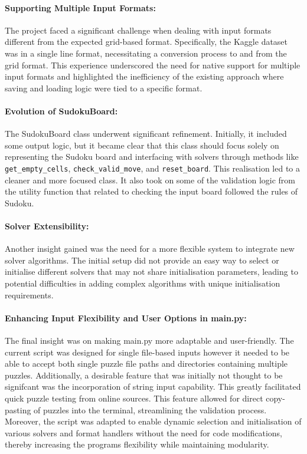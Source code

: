 \documentclass[11pt]{article}
\begin{document}
\paragraph{Supporting Multiple Input Formats:}
The project faced a significant challenge when dealing with input formats different from the expected grid-based format. Specifically, the Kaggle dataset was in a single line format, necessitating a conversion process to and from the grid format. This experience underscored the need for native support for multiple input formats and highlighted the inefficiency of the existing approach where saving and loading logic were tied to a specific format.

\paragraph{Evolution of SudokuBoard:}
The SudokuBoard class underwent significant refinement. Initially, it included some output logic, but it became clear that this class should focus solely on representing the Sudoku board and interfacing with solvers through methods like \texttt{get\_empty\_cells}, \texttt{check\_valid\_move}, and \texttt{reset\_board}. This realisation led to a cleaner and more focused class. It also took on some of the validation logic from the utility function that related to checking the input board followed the rules of Sudoku.

\paragraph{Solver Extensibility:}
Another insight gained was the need for a more flexible system to integrate new solver algorithms. The initial setup did not provide an easy way to select or initialise different solvers that may not share initialisation parameters, leading to potential difficulties in adding complex algorithms with unique initialisation requirements.

\paragraph{Enhancing Input Flexibility and User Options in main.py:}
The final insight was on making main.py more adaptable and user-friendly. The current script was designed for single file-based inputs however it needed to be able to accept both single puzzle file paths and directories containing multiple puzzles. Additionally, a desirable feature that was initially not thought to be signifcant was the incorporation of string input capability. This greatly facilitated quick puzzle testing from online sources. This feature allowed for direct copy-pasting of puzzles into the terminal, streamlining the validation process. Moreover, the script was adapted to enable dynamic selection and initialisation of various solvers and format handlers without the need for code modifications, thereby increasing the programs flexibility while maintaining modularity.
\end{document}
